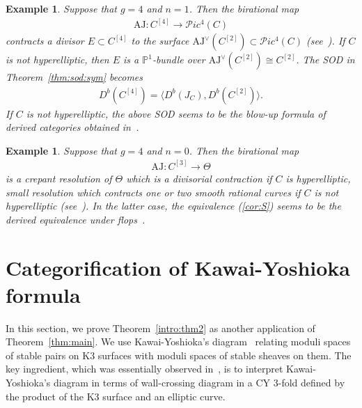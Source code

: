 \documentclass[11pt]{amsart}
\theoremstyle{plain}
\newtheorem{exam}[thm]{Example}
\newcommand{\pP}{\mathcal{P}}
\begin{document}
\begin{exam}
 Suppose that $g=4$ and $n=1$. Then the birational map
\begin{align*}
\mathrm{AJ} \colon C^{[4]} \to \pP ic^4(C)
\end{align*}
contracts a divisor $E \subset C^{[4]}$
to the surface $\mathrm{AJ}^{\vee}(C^{[2]}) \subset \pP ic^4(C)$
(see~\cite[Example~1.0.10]{MR3114949}). 
If $C$ is not hyperelliptic, then $E$ is 
a $\mathbb{P}^1$-bundle over 
$\mathrm{AJ}^{\vee}(C^{[2]}) \cong C^{[2]}$. 
The SOD in Theorem~\ref{thm:sod:sym} becomes
\begin{align*}
D^b(C^{[4]})=
\langle D^b(J_C), D^b(C^{[2]})\rangle.
\end{align*}
If $C$ is not hyperelliptic, 
the above SOD seems to be the blow-up formula
of derived categories obtained in~\cite{MR1208153}. 
\end{exam}

\begin{exam}
 Suppose that $g=4$ and $n=0$. 
Then the birational map 
\begin{align*}
\mathrm{AJ} \colon C^{[3]} \to \Theta
\end{align*}
is a crepant resolution of $\Theta$ which is 
a divisorial contraction if $C$ is hyperelliptic, 
small resolution which contracts 
one or two smooth rational curves
if $C$ is not hyperelliptic
(see~\cite[Example~1.0.10]{MR3114949}). 
In the latter case, the 
equivalence (\ref{cor:S})
seems to be the 
derived equivalence under flops~\cite{B-O1, Br1}. 
\end{exam}






\section{Categorification of Kawai-Yoshioka formula}\label{sec:KY}
In this section, we prove Theorem~\ref{intro:thm2} as 
another application 
of Theorem~\ref{thm:main}.
We use Kawai-Yoshioka's diagram~\cite{KY} 
relating moduli spaces of stable pairs on K3 surfaces
with moduli spaces of stable sheaves on them. 
The key ingredient, 
which was essentially observed in~\cite{TodK3}, is to interpret 
Kawai-Yoshioka's diagram in terms of wall-crossing diagram in a
CY 3-fold defined by 
the product of the K3 surface and an elliptic curve.
\end{document}
